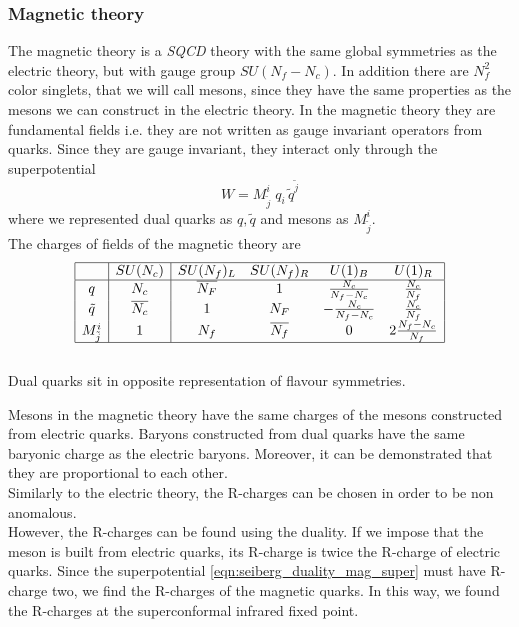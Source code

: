 \subsubsection{Magnetic theory}
The magnetic theory is a \emph{SQCD} theory with the same global symmetries as the electric theory, but with gauge group $SU(N_f - N_c)$. 
In addition there are $N_f^2$ color singlets, that we will call mesons, since they have the same properties as the mesons we can construct in the electric theory.
In the magnetic theory they are fundamental fields i.e. they are not written as gauge invariant operators from quarks. 
Since they are gauge invariant, they interact only through the superpotential
\begin{equation}
 W  = M^i_{\tilde{j}} \; q_i \, \tilde{q}^{\tilde{j}}
 \label{eqn:seiberg_duality_mag_super}
\end{equation}
where we represented dual quarks as $q,\tilde{q}$ and mesons as $M^i_{\tilde{j}} $.\\
The charges of fields of the magnetic theory are
\begin{equation}
 \begin{array}{| c | c |  c c c c |  }
 \hline
 & SU(N_c) & SU(N_f)_L  &SU(N_f)_R   & U(1)_B &  U(1)_R \\
\hline
q & N_c & \overline{N_F} & 1   &   \frac{N_c}{N_f-N_c}   &  \frac{N_c}{N_f}  \\
\tilde{q} &\overline{N_c}  &  1 & { N_F}   & - \frac{N_c}{N_f-N_c}   &   \frac{N_c}{N_f}   \\	 
M^i_{\tilde{j}}  &  1  & N_f & \overline{N_f}  & 0 &  2 \frac{N_f - N_c}{N_f}\\ 
\hline
 \end{array}
\end{equation}\\
Dual quarks sit in opposite representation of flavour symmetries. 

Mesons in the magnetic theory have the same charges of the mesons constructed from electric quarks.
Baryons constructed from dual quarks have the same baryonic charge as the electric baryons.
Moreover, it can be demonstrated that they are proportional to each other.\\
Similarly to the electric theory, the R-charges can be chosen in order to be non anomalous.\\
However, the R-charges can be found using the duality.
If we impose that the meson is built from electric quarks, its R-charge is twice the R-charge of electric quarks.
Since the superpotential \eqref{eqn:seiberg_duality_mag_super} must have R-charge two, we find the R-charges of the magnetic quarks.
In this way, we found the R-charges at the superconformal infrared fixed point.

